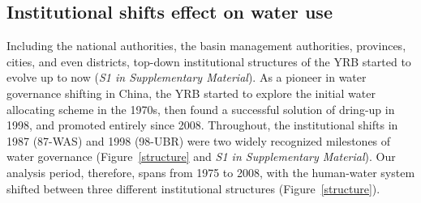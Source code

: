 \subsection{Institutional shifts effect on water use}
\label{effects}
Including the national authorities, the basin management authorities, provinces, cities, and even districts, top-down institutional structures of the YRB started to evolve up to now (\textit{S1 in Supplementary Material}).
As a pioneer in water governance shifting in China, the YRB started to explore the initial water allocating scheme in the 1970s, then found a successful solution of dring-up in 1998, and promoted entirely since 2008.
Throughout, the institutional shifts in 1987 (87-WAS) and 1998 (98-UBR) were two widely recognized milestones of water governance (Figure~\ref{structure} and \textit{S1 in Supplementary Material}).
Our analysis period, therefore, spans from 1975 to 2008, with the human-water system shifted between three different institutional structures (Figure~\ref{structure}).

